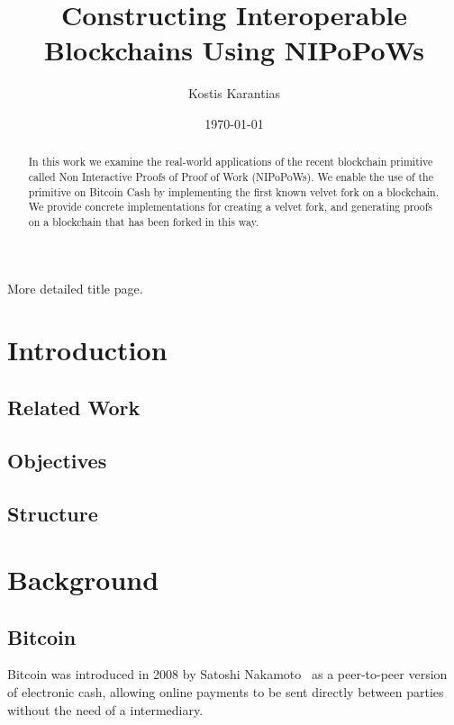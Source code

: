 \documentclass[11pt]{llncs}
\begin{document}
\title{Constructing Interoperable Blockchains Using NIPoPoWs}
\date{\today}
\author{Kostis Karantias\\
    }
\maketitle
\noindent
\makebox[\linewidth]{\small \today}

\newpage
\null
\newpage

More detailed title page.

\newpage
\null
\newpage

\begin{abstract}
  In this work we examine the real-world applications of the recent blockchain
  primitive called Non Interactive Proofs of Proof of Work (NIPoPoWs). We
  enable the use of the primitive on Bitcoin Cash by implementing the first
  known velvet fork on a blockchain. We provide concrete implementations for
  creating a velvet fork, and generating proofs on a blockchain that has been
  forked in this way.
\end{abstract}

\newpage

\tableofcontents

\newpage

\thispagestyle{plain}

\section{Introduction}

\subsection{Related Work}
\subsection{Objectives}
\subsection{Structure}

\section{Background}

\subsection{Bitcoin}
Bitcoin was introduced in 2008 by Satoshi Nakamoto~\cite{bitcoin} as a
peer-to-peer version of electronic cash, allowing online payments to be sent
directly between parties without the need of a intermediary.
\end{document}
